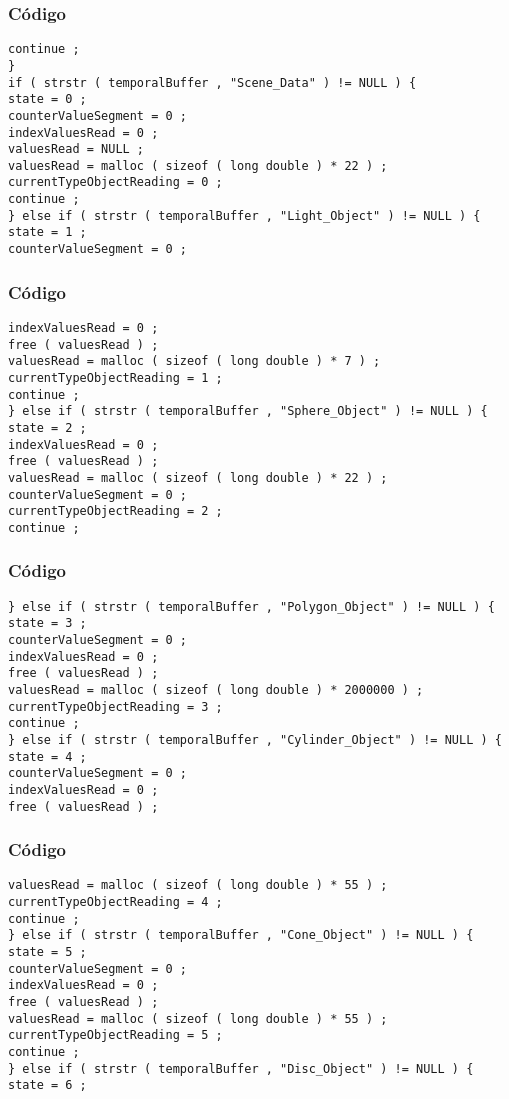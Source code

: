 \documentclass{beamer}
\begin{document}
\begin{frame}[fragile]
\frametitle{C\'odigo}
\begin{verbatim}
continue ; 
} 
if ( strstr ( temporalBuffer , "Scene_Data" ) != NULL ) { 
state = 0 ; 
counterValueSegment = 0 ; 
indexValuesRead = 0 ; 
valuesRead = NULL ; 
valuesRead = malloc ( sizeof ( long double ) * 22 ) ; 
currentTypeObjectReading = 0 ; 
continue ; 
} else if ( strstr ( temporalBuffer , "Light_Object" ) != NULL ) { 
state = 1 ; 
counterValueSegment = 0 ; 
\end{verbatim}
\end{frame}
\begin{frame}[fragile]
\frametitle{C\'odigo}
\begin{verbatim}
indexValuesRead = 0 ; 
free ( valuesRead ) ; 
valuesRead = malloc ( sizeof ( long double ) * 7 ) ; 
currentTypeObjectReading = 1 ; 
continue ; 
} else if ( strstr ( temporalBuffer , "Sphere_Object" ) != NULL ) { 
state = 2 ; 
indexValuesRead = 0 ; 
free ( valuesRead ) ; 
valuesRead = malloc ( sizeof ( long double ) * 22 ) ; 
counterValueSegment = 0 ; 
currentTypeObjectReading = 2 ; 
continue ; 
\end{verbatim}
\end{frame}
\begin{frame}[fragile]
\frametitle{C\'odigo}
\begin{verbatim}
} else if ( strstr ( temporalBuffer , "Polygon_Object" ) != NULL ) { 
state = 3 ; 
counterValueSegment = 0 ; 
indexValuesRead = 0 ; 
free ( valuesRead ) ; 
valuesRead = malloc ( sizeof ( long double ) * 2000000 ) ; 
currentTypeObjectReading = 3 ; 
continue ; 
} else if ( strstr ( temporalBuffer , "Cylinder_Object" ) != NULL ) { 
state = 4 ; 
counterValueSegment = 0 ; 
indexValuesRead = 0 ; 
free ( valuesRead ) ; 
\end{verbatim}
\end{frame}
\begin{frame}[fragile]
\frametitle{C\'odigo}
\begin{verbatim}
valuesRead = malloc ( sizeof ( long double ) * 55 ) ; 
currentTypeObjectReading = 4 ; 
continue ; 
} else if ( strstr ( temporalBuffer , "Cone_Object" ) != NULL ) { 
state = 5 ; 
counterValueSegment = 0 ; 
indexValuesRead = 0 ; 
free ( valuesRead ) ; 
valuesRead = malloc ( sizeof ( long double ) * 55 ) ; 
currentTypeObjectReading = 5 ; 
continue ; 
} else if ( strstr ( temporalBuffer , "Disc_Object" ) != NULL ) { 
state = 6 ; 
\end{verbatim}
\end{frame}
\end{document}
